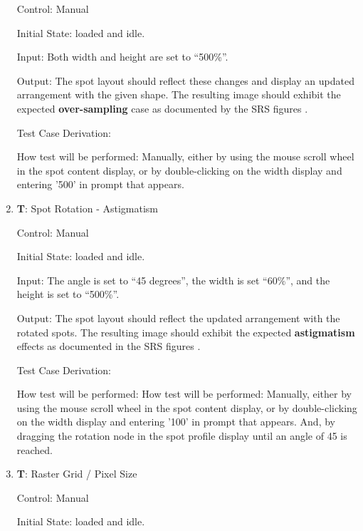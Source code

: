 \documentclass[12pt, titlepage]{article}
\newcounter{testnum} %
\begin{document}
\begin{enumerate}
    Control: Manual
              
    Initial State: \progname{} loaded and idle.
              
    Input: Both width and height are set to ``500\%''.
              
    Output: The spot layout should reflect these changes and display an updated arrangement with the given shape.
    The resulting image should exhibit the expected \textbf{over-sampling} case as documented by the SRS figures \citep{SRS}.

    Test Case Derivation: 
              
    How test will be performed: Manually, either by using the mouse scroll wheel in
      the spot content display, or by double-clicking on the width display and entering '500'
      in prompt that appears.
					
  \item{\textbf{T\thetestnum \label{T_spotRotation}}: Spot Rotation - Astigmatism\\}

    Control: Manual
                
    Initial State: \progname{} loaded and idle.
              
    Input: The angle is set to ``45 degrees'', the width is set ``60\%'', and the height is set to ``500\%''.
              
    Output: The spot layout should reflect the updated arrangement with the rotated spots.
    The resulting image should exhibit the expected \textbf{astigmatism} effects as documented in the SRS figures \citep{SRS}.

    Test Case Derivation: 

    How test will be performed: How test will be performed: Manually, either by using the mouse scroll wheel in
    the spot content display, or by double-clicking on the width display and entering '100'
    in prompt that appears. And, by dragging the rotation node in the spot profile display
    until an angle of 45 is reached.
					
    \item{\textbf{T\thetestnum \label{T_rasterGrid}}: Raster Grid / Pixel Size\\}

    Control: Manual
                
    Initial State: \progname{} loaded and idle.
              

\end{enumerate}
\end{document}

